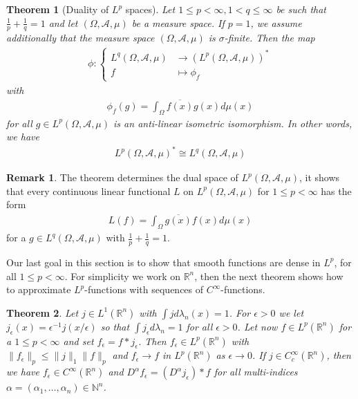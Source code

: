 \documentclass[11pt,a4paper]{article}
\newtheorem{thm}{Theorem}[section]
\theoremstyle{definition}
\newtheorem{rem}{Remark}[section]
\begin{document}
\begin{thm}[Duality of $L^p$ spaces] Let $1 \leq p < \infty, 1 < q \leq \infty$ be such that $\frac{1}{p} + \frac{1}{q}=1$ and let $( \Omega, \mathcal{A}, \mu)$ be a measure space. If $p=1$, we assume additionally that the measure space $( \Omega, \mathcal{A}, \mu)$ is $\sigma$-finite.  Then the map
\begin{align*}
\phi : \begin{cases} L^q(\Omega, \mathcal{A}, \mu) & \longrightarrow(L^p (\Omega, \mathcal{A}, \mu))^* \\
f & \longmapsto \phi_f \end{cases}
\end{align*}
with 
\begin{align*}
\phi_f(g) = \int_\Omega \overline{f(x)}g(x) d \mu(x)
\end{align*}
for all $g \in L^p(\Omega, \mathcal{A}, \mu)$ is an anti-linear isometric isomorphism. In other words, we have
\begin{align*}
L^p(\Omega, \mathcal{A}, \mu)^* \cong L^q(\Omega, \mathcal{A}, \mu)
\end{align*}
\end{thm}
\begin{rem} The theorem determines the dual space of $L^p(\Omega, \mathcal{A}, \mu)$, it shows that every continuous linear functional $L$ on $L^p(\Omega, \mathcal{A}, \mu)$ for $1 \leq p < \infty$ has the form 
\begin{align*}
L(f)= \int_\Omega \overline{g(x)} f(x) d \mu(x)
\end{align*}
for a $g \in L^q(\Omega, \mathcal{A}, \mu)$ with $\frac{1}{p} + \frac{1}{q}=1$. 
\end{rem}
\newpage
Our last goal in this section is to show that smooth functions are dense in $L^p$, for all $1 \leq p < \infty$. For simplicity we work on $\mathbb{R}^n$, then the next theorem shows how to approximate $L^p$-functions with sequences of $C^\infty$-functions.
\begin{thm} Let $j \in L^1 ( \mathbb{R}^n)$ with $\int j d \lambda_n(x) =1$. For $\epsilon >0$ we let $j_\epsilon(x) = \epsilon^{-1} j(x/ \epsilon)$ so that $\int j_\epsilon d\lambda_n =1$ for all $\epsilon >0$. Let now $f \in L^p( \mathbb{R}^n)$ for a $1 \leq p < \infty$ and set $f_ \epsilon = f * j_\epsilon$. Then $f_\epsilon \in L^p( \mathbb{R}^n)$ with $\|f_\epsilon \|_p \leq \|j\|_1 \|f\|_p$ and $f_\epsilon\to f $ in $L^p( \mathbb{R}^n)$ as $\epsilon \to 0$. If $j \in C_c^\infty ( \mathbb{R}^n)$, then we have $f_\epsilon \in C^\infty ( \mathbb{R}^n)$ and $D^\alpha f_\epsilon = (D^\alpha j_\epsilon) * f$ for all multi-indices $\alpha= ( \alpha_1, \dots, \alpha_n) \in \mathbb{N}^n$. 
\end{thm}
\end{document}
